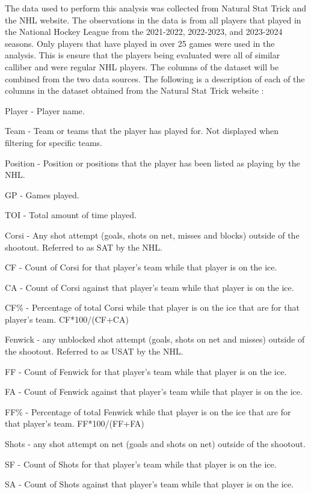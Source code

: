 \documentclass[12pt]{article}
\begin{document}
The data used to perform this analysis was collected from Natural Stat Trick and the NHL website. The observations in the data
is from all players that played in the National Hockey League from the 2021-2022, 2022-2023, and 2023-2024 seasons. Only players
that have played in over 25 games were used in the analysis. This is ensure that the players being evaluated were all of similar 
calliber and were regular NHL players. The columns of the dataset will be combined from the two data sources. The following is a 
description of each of the columns in the dataset obtained from the Natural Stat Trick website \cite{natural_stat_trick}:

Player - Player name.

Team - Team or teams that the player has played for. Not displayed when filtering for specific teams.

Position - Position or positions that the player has been listed as playing by the NHL.

GP - Games played.

TOI - Total amount of time played.

Corsi - Any shot attempt (goals, shots on net, misses and blocks) outside of the shootout. Referred to as SAT by the NHL.

CF - Count of Corsi for that player's team while that player is on the ice.

CA - Count of Corsi against that player's team while that player is on the ice.

CF\% - Percentage of total Corsi while that player is on the ice that are for that player's team. CF*100/(CF+CA)

Fenwick - any unblocked shot attempt (goals, shots on net and misses) outside of the shootout. Referred to as USAT by the NHL.

FF - Count of Fenwick for that player's team while that player is on the ice.

FA - Count of Fenwick against that player's team while that player is on the ice.

FF\% - Percentage of total Fenwick while that player is on the ice that are for that player's team. FF*100/(FF+FA)

Shots - any shot attempt on net (goals and shots on net) outside of the shootout.

SF - Count of Shots for that player's team while that player is on the ice.

SA - Count of Shots against that player's team while that player is on the ice.
\end{document}
